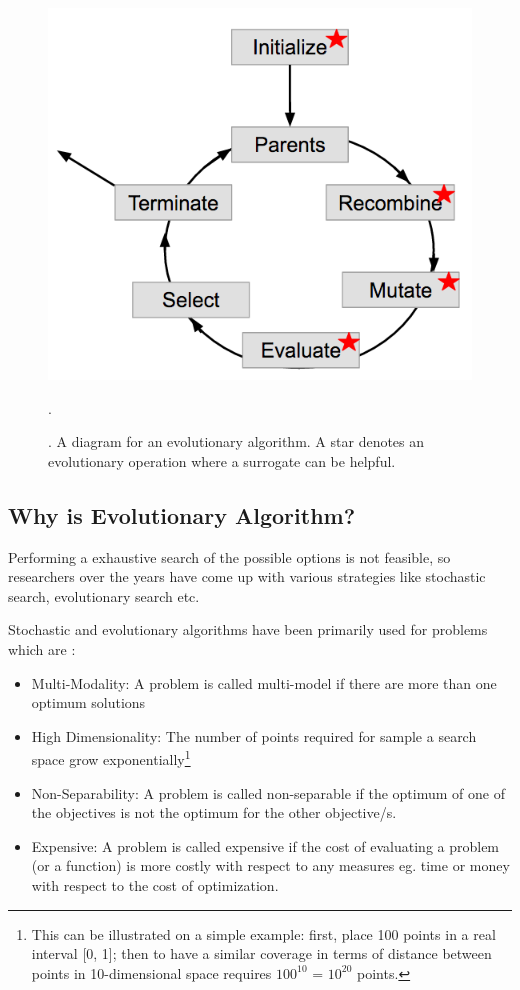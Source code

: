\documentclass{newsig}
\begin{document}
 \begin{figure}[tbh]
\centering
\includegraphics[width=0.9\columnwidth]{Figures/EA_Diagram}
\caption{. A diagram for an evolutionary algorithm.
A star denotes an evolutionary operation where a surrogate can be helpful.}.
\label{fig:ea_figure}
\end{figure}

 \subsection*{Why is Evolutionary Algorithm?}\label{section:whyea}
 Performing a exhaustive search of the possible options is not feasible, so researchers over the years have come up with various strategies like stochastic search, evolutionary search etc. 
 
 Stochastic and evolutionary algorithms have been primarily used for problems which are :
     \begin{itemize}
     \item{Multi-Modality: A problem is called multi-model if there are more than one optimum solutions}
     \item{High Dimensionality: The number of points required for sample a search space grow exponentially\footnote{This can be illustrated on a simple example: first, place 100 points
    in a real interval [0, 1]; then to have a similar coverage in terms of distance between
    points in 10-dimensional space requires $100^{10}$ = $10^{20}$ points.}}
    \item{Non-Separability: A problem is called non-separable if the optimum of one of the objectives is not the optimum for the other objective/s.}
    \item{Expensive: A problem is called expensive if the cost of evaluating a problem (or a function) is more costly with respect to any measures eg. time or money with respect to the cost of optimization.}
 \end{itemize}
 
\end{document}
